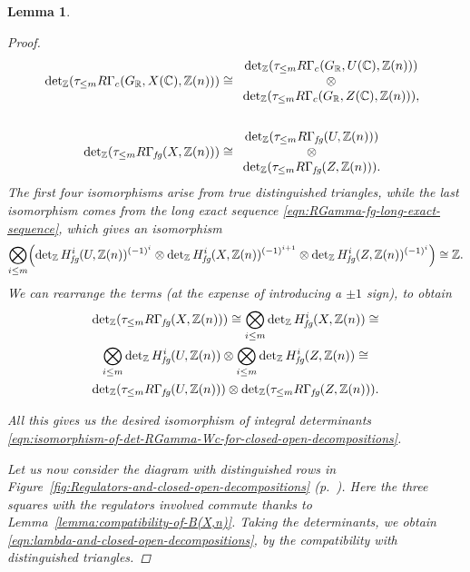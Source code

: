 \documentclass[10pt,a4paper,oneside,draft]{article}
\newcommand{\CC}{\mathbb{C}}
\newcommand{\RR}{\mathbb{R}}
\newcommand{\ZZ}{\mathbb{Z}}
\renewcommand{\det}{\operatorname{det}}
\newcommand{\fg}{\text{\it fg}}
\theoremstyle{myplain}
\newtheorem{lemma}[theorem]{Lemma}
\theoremstyle{mydefinition}
\numberwithin{equation}{section}
\begin{document}
\begin{lemma}
\begin{proof}
\begin{align*}
      \det_\ZZ (\tau_{\le m} R\Gamma_c (G_\RR, X (\CC), \ZZ(n))) & \cong \begin{array}{c} \det_\ZZ (\tau_{\le m} R\Gamma_c (G_\RR, U (\CC), \ZZ (n))) \\ \otimes \\ \det_\ZZ (\tau_{\le m} R\Gamma_c (G_\RR, Z (\CC), \ZZ(n))), \end{array} \\
      \\
      \det_\ZZ (\tau_{\le m} R\Gamma_\fg (X, \ZZ(n))) & \cong \begin{array}{c} \det_\ZZ (\tau_{\le m} R\Gamma_\fg (U, \ZZ (n))) \\ \otimes \\ \det_\ZZ (\tau_{\le m} R\Gamma_\fg (Z, \ZZ(n))).\end{array}
    \end{align*}
    The first four isomorphisms arise from true distinguished triangles, while
    the last isomorphism comes from the long exact sequence
    \eqref{eqn:RGamma-fg-long-exact-sequence}, which gives an isomorphism
    \begin{equation}\small
      \bigotimes_{i \le m}
      \Bigl(\det_\ZZ H^i_\fg (U, \ZZ(n))^{(-1)^i} \otimes
      \det_\ZZ H^i_\fg (X, \ZZ(n))^{(-1)^{i+1}} \otimes
      \det_\ZZ H^i_\fg (Z, \ZZ(n))^{(-1)^i}\Bigr) \cong \ZZ.
    \end{equation}
    We can rearrange the terms
    (at the expense of introducing a $\pm 1$ sign),
    to obtain
    \begin{multline*}
      \det_\ZZ (\tau_{\le m} R\Gamma_\fg (X, \ZZ(n))) \cong
      \bigotimes_{i \le m} \det_\ZZ H^i_\fg (X, \ZZ(n)) \cong \\
      \bigotimes_{i \le m} \det_\ZZ H^i_\fg (U, \ZZ(n)) \otimes
      \bigotimes_{i \le m} \det_\ZZ H^i_\fg (Z, \ZZ(n)) \cong \\
      \det_\ZZ (\tau_{\le m} R\Gamma_\fg (U, \ZZ(n))) \otimes
      \det_\ZZ (\tau_{\le m} R\Gamma_\fg (Z, \ZZ(n))).
    \end{multline*}

    All this gives us the desired isomorphism of integral determinants
    \eqref{eqn:isomorphism-of-det-RGamma-Wc-for-closed-open-decompositions}.

    Let us now consider the diagram with distinguished rows in
    Figure~\ref{fig:Regulators-and-closed-open-decompositions}
    (p.~\pageref{fig:Regulators-and-closed-open-decompositions}).
    Here the three squares with the regulators involved commute thanks to
    Lemma~\ref{lemma:compatibility-of-B(X,n)}. Taking the determinants, we
    obtain \eqref{eqn:lambda-and-closed-open-decompositions}, by the
    compatibility with distinguished triangles.
  \end{proof}
\end{lemma}
\end{document}
